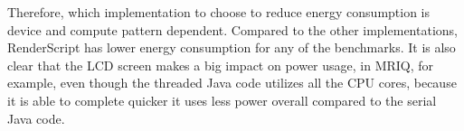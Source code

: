 Therefore, which implementation to choose to reduce energy consumption is device and compute pattern dependent.
Compared to the other implementations, RenderScript has lower energy consumption for any of the benchmarks.
It is also clear that the LCD screen makes a big impact on power usage, in MRIQ, for example, even though the threaded Java code
  utilizes all the CPU cores, because it is able to complete quicker it uses less power overall compared to the serial Java code.

